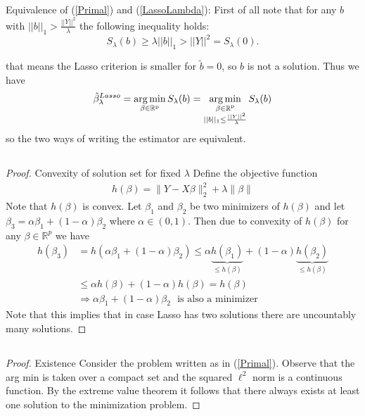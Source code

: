 \documentclass{article}
\theoremstyle{definition}
\DeclareMathOperator*{\argmin}{arg\,min}
\begin{document}
\subsection{}Equivalence of (\ref{Primal}) and (\ref{LassoLambda}):
First of all note that for any $b$ with $||b||_1 > \frac{||Y||^2}{\lambda}$ the following inequality holds:
\begin{equation}
	S_\lambda(b) \geq \lambda ||b||_1 > ||Y||^2 = S_\lambda(0).
\end{equation}

that means the Lasso criterion is smaller for $\tilde{b}=0$, so $b$ is not a solution.
Thus we have
\begin{equation*}
 \hat{\beta}_\lambda^{Lasso} = \argmin_{\beta \in\rm \mathbb{R}^p} S_\lambda(b) = \argmin_{\substack{\beta \in\rm \mathbb{R}^p\\ ||b||_1 \leq \frac{||Y||^2}{\lambda}}} S_\lambda(b)
\end{equation*}
so the two ways of writing the estimator are equivalent.

\subsection{}\begin{proof} Convexity of solution set for fixed $\lambda$ \newline
Define the objective function
\begin{align*}
h(\beta)=\|Y-X\beta\|_2^2+\lambda\|\beta\|
\end{align*}
Note that $h(\beta)$ is convex. Let $\beta_1$ and $\beta_2$ be two minimizers of $h(\beta)$ and let $\beta_3=\alpha\beta_1+(1-\alpha)\beta_2$ where $\alpha \in (0,1)$. Then due to convexity of $h(\beta)$ for any $\beta \in \mathbb{R}^p$ we have
\begin{align*}
h(\beta_3)&=h(\alpha\beta_1+(1-\alpha)\beta_2) \leq \alpha \underbrace{h(\beta_1)}_{\leq h(\beta)}+(1-\alpha)\underbrace{h(\beta_2)}_{\leq h(\beta)} \\ &\leq \alpha h(\beta)+(1-\alpha)h(\beta)=h(\beta) \\ &\Rightarrow \alpha\beta_1+(1-\alpha)\beta_2 \ \ \ \text{is also a minimizer}
\end{align*}
Note that this implies that in case Lasso has two solutions there are uncountably many solutions.
\end{proof}

\subsection{} \begin{proof} Existence \newline
Consider the problem written as in (\ref{Primal}). Observe that the arg min is taken over a compact set and the squared $\ell^2$ norm is a continuous function. By the extreme value theorem it follows that there always exists at least one solution to the minimization problem.
\end{proof}
\end{document}
